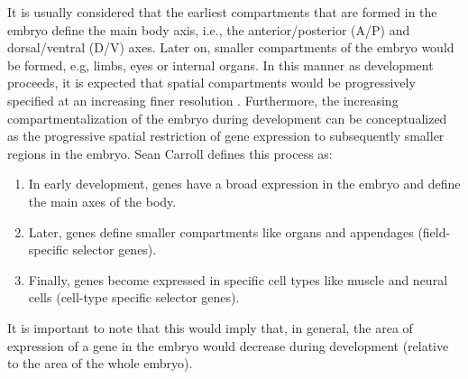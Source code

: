 It is usually considered that the earliest compartments that are formed in the embryo define the main body axis, i.e., the anterior/posterior (A/P) and dorsal/ventral (D/V) axes.
Later on, smaller compartments of the embryo would be formed, e.g, limbs, eyes or internal organs. In this manner as development proceeds, it is expected that spatial compartments would be progressively specified at an increasing finer resolution \citep{Davidson2001}.
Furthermore, the increasing compartmentalization of the embryo during development can be conceptualized as the progressive spatial restriction of gene expression to subsequently smaller regions in the embryo.
Sean Carroll defines this process\citep{Carroll2001} as:
\begin{enumerate}
\item In early development, genes have a broad expression in the embryo and define the main axes of the body.
\item Later, genes define smaller compartments like organs and appendages (field-specific selector genes).
\item Finally, genes become expressed in specific cell types like muscle and neural cells (cell-type specific selector genes). 
\end{enumerate}
It is important to note that this would imply that, in general, the area of expression of a gene in the embryo would decrease during development (relative to the area of the whole embryo).

